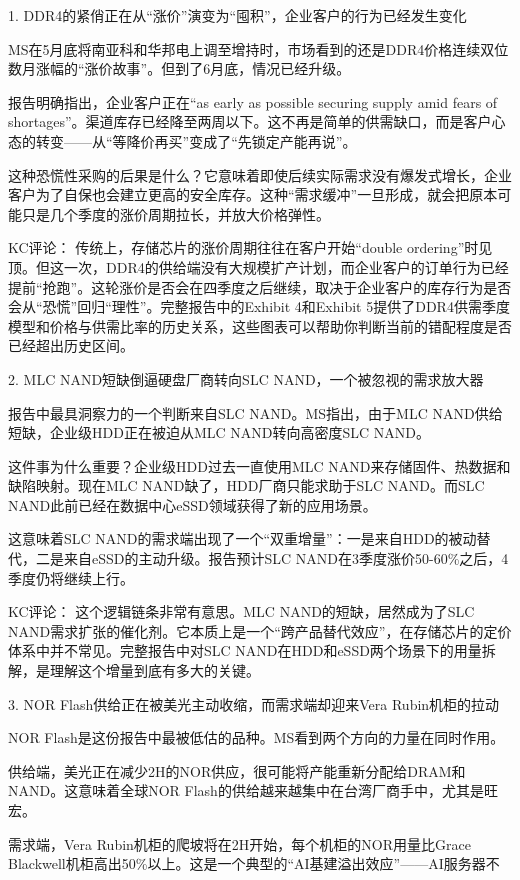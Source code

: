 \documentclass[11pt]{ctexart}
\begin{document}
1. DDR4的紧俏正在从“涨价”演变为“囤积”，企业客户的行为已经发生变化

MS在5月底将南亚科和华邦电上调至增持时，市场看到的还是DDR4价格连续双位数月涨幅的“涨价故事”。但到了6月底，情况已经升级。

报告明确指出，企业客户正在“as early as possible securing supply amid fears of shortages”。渠道库存已经降至两周以下。这不再是简单的供需缺口，而是客户心态的转变——从“等降价再买”变成了“先锁定产能再说”。

这种恐慌性采购的后果是什么？它意味着即使后续实际需求没有爆发式增长，企业客户为了自保也会建立更高的安全库存。这种“需求缓冲”一旦形成，就会把原本可能只是几个季度的涨价周期拉长，并放大价格弹性。

KC评论： 传统上，存储芯片的涨价周期往往在客户开始“double ordering”时见顶。但这一次，DDR4的供给端没有大规模扩产计划，而企业客户的订单行为已经提前“抢跑”。这轮涨价是否会在四季度之后继续，取决于企业客户的库存行为是否会从“恐慌”回归“理性”。完整报告中的Exhibit 4和Exhibit 5提供了DDR4供需季度模型和价格与供需比率的历史关系，这些图表可以帮助你判断当前的错配程度是否已经超出历史区间。

2. MLC NAND短缺倒逼硬盘厂商转向SLC NAND，一个被忽视的需求放大器

报告中最具洞察力的一个判断来自SLC NAND。MS指出，由于MLC NAND供给短缺，企业级HDD正在被迫从MLC NAND转向高密度SLC NAND。

这件事为什么重要？企业级HDD过去一直使用MLC NAND来存储固件、热数据和缺陷映射。现在MLC NAND缺了，HDD厂商只能求助于SLC NAND。而SLC NAND此前已经在数据中心eSSD领域获得了新的应用场景。

这意味着SLC NAND的需求端出现了一个“双重增量”：一是来自HDD的被动替代，二是来自eSSD的主动升级。报告预计SLC NAND在3季度涨价50-60\%之后，4季度仍将继续上行。

KC评论： 这个逻辑链条非常有意思。MLC NAND的短缺，居然成为了SLC NAND需求扩张的催化剂。它本质上是一个“跨产品替代效应”，在存储芯片的定价体系中并不常见。完整报告中对SLC NAND在HDD和eSSD两个场景下的用量拆解，是理解这个增量到底有多大的关键。

3. NOR Flash供给正在被美光主动收缩，而需求端却迎来Vera Rubin机柜的拉动

NOR Flash是这份报告中最被低估的品种。MS看到两个方向的力量在同时作用。

供给端，美光正在减少2H的NOR供应，很可能将产能重新分配给DRAM和NAND。这意味着全球NOR Flash的供给越来越集中在台湾厂商手中，尤其是旺宏。

需求端，Vera Rubin机柜的爬坡将在2H开始，每个机柜的NOR用量比Grace Blackwell机柜高出50\%以上。这是一个典型的“AI基建溢出效应”——AI服务器不
\end{document}
